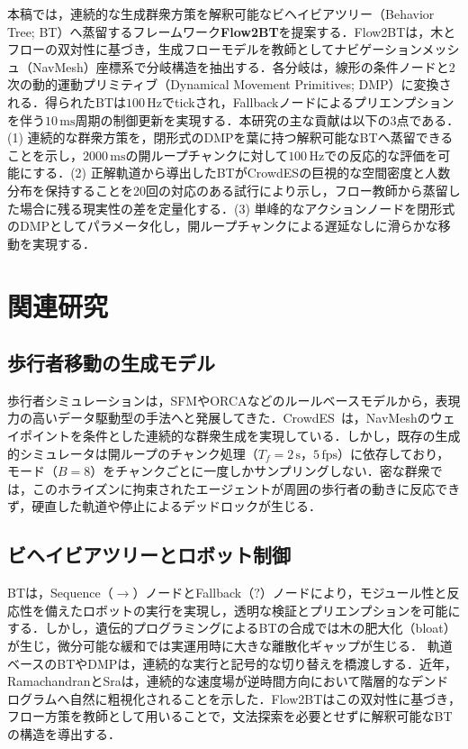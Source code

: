 \documentclass{sice-si}
\begin{document}
本稿では，連続的な生成群衆方策を解釈可能なビヘイビアツリー（Behavior Tree; BT）\cite{colledanchise2018behavior}へ蒸留するフレームワーク\textbf{Flow2BT}を提案する．Flow2BTは，木とフローの双対性\cite{ramachandran2026trees}に基づき，生成フローモデルを教師としてナビゲーションメッシュ（NavMesh）座標系で分岐構造を抽出する．各分岐は，線形の条件ノードと2次の動的運動プリミティブ（Dynamical Movement Primitives; DMP）\cite{chatzilygeroudis2021behavior}に変換される．得られたBTは$100\,\text{Hz}$でtickされ，Fallbackノードによるプリエンプションを伴う$10\,\text{ms}$周期の制御更新を実現する．本研究の主な貢献は以下の3点である．(1) 連続的な群衆方策を，閉形式のDMPを葉に持つ解釈可能なBTへ蒸留できることを示し，$2000\,\text{ms}$の開ループチャンクに対して$100\,\text{Hz}$での反応的な評価を可能にする．(2) 正解軌道から導出したBTがCrowdESの巨視的な空間密度と人数分布を保持することを20回の対応のある試行により示し，フロー教師から蒸留した場合に残る現実性の差を定量化する．(3) 単峰的なアクションノードを閉形式のDMPとしてパラメータ化し，開ループチャンクによる遅延なしに滑らかな移動を実現する．

\section{関連研究}
\subsection{歩行者移動の生成モデル}
歩行者シミュレーションは，SFM\cite{helbing1995social}やORCA\cite{vandenberg2011reciprocal}などのルールベースモデルから，表現力の高いデータ駆動型の手法\cite{alahi2016social,lipman2023flow}へと発展してきた．CrowdES~\cite{bae2025crowdes}は，NavMeshのウェイポイントを条件とした連続的な群衆生成を実現している．しかし，既存の生成的シミュレータは開ループのチャンク処理（$T_f = 2\,\text{s}$，$5\,\text{fps}$）に依存しており，モード（$B=8$）をチャンクごとに一度しかサンプリングしない．密な群衆では，このホライズンに拘束されたエージェントが周囲の歩行者の動きに反応できず，硬直した軌道や停止によるデッドロックが生じる．

\subsection{ビヘイビアツリーとロボット制御}
BTは，Sequence（$\to$）ノードとFallback（$?$）ノードにより，モジュール性と反応性を備えたロボットの実行を実現し\cite{colledanchise2018behavior,iovino2022survey}，透明な検証とプリエンプションを可能にする．しかし，遺伝的プログラミングによるBTの合成\cite{iovino2022survey}では木の肥大化（bloat）が生じ，微分可能な緩和\cite{huang2025differentiable}では実運用時に大きな離散化ギャップが生じる．
軌道ベースのBTやDMP\cite{chatzilygeroudis2021behavior,ijspeert2013dynamical}は，連続的な実行と記号的な切り替えを橋渡しする．近年，RamachandranとSra\cite{ramachandran2026trees}は，連続的な速度場が逆時間方向において階層的なデンドログラムへ自然に粗視化されることを示した．Flow2BTはこの双対性に基づき，フロー方策を教師として用いることで，文法探索を必要とせずに解釈可能なBTの構造を導出する．
\end{document}
